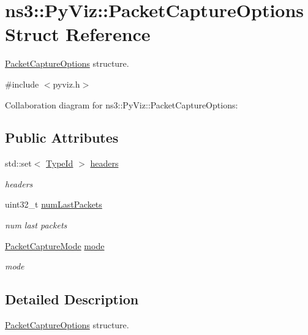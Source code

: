 \hypertarget{structns3_1_1PyViz_1_1PacketCaptureOptions}{}\section{ns3\+:\+:Py\+Viz\+:\+:Packet\+Capture\+Options Struct Reference}
\label{structns3_1_1PyViz_1_1PacketCaptureOptions}


\hyperlink{structns3_1_1PyViz_1_1PacketCaptureOptions}{Packet\+Capture\+Options} structure.  




{\ttfamily \#include $<$pyviz.\+h$>$}



Collaboration diagram for ns3\+:\+:Py\+Viz\+:\+:Packet\+Capture\+Options\+:
\subsection*{Public Attributes}
\begin{DoxyCompactItemize}
\item 
std\+::set$<$ \hyperlink{classns3_1_1TypeId}{Type\+Id} $>$ \hyperlink{structns3_1_1PyViz_1_1PacketCaptureOptions_ad59cd9cdfe4df5223e037b561ea21d26}{headers}
\begin{DoxyCompactList}\small\item\em headers \end{DoxyCompactList}\item 
uint32\+\_\+t \hyperlink{structns3_1_1PyViz_1_1PacketCaptureOptions_a97e06e581617e9aced369d0a7968962c}{num\+Last\+Packets}
\begin{DoxyCompactList}\small\item\em num last packets \end{DoxyCompactList}\item 
\hyperlink{classns3_1_1PyViz_afefded0f19591a14d78d7031573cce86}{Packet\+Capture\+Mode} \hyperlink{structns3_1_1PyViz_1_1PacketCaptureOptions_a0318a6f8e0ceff173b86f272b687b5a5}{mode}
\begin{DoxyCompactList}\small\item\em mode \end{DoxyCompactList}\end{DoxyCompactItemize}


\subsection{Detailed Description}
\hyperlink{structns3_1_1PyViz_1_1PacketCaptureOptions}{Packet\+Capture\+Options} structure. 

